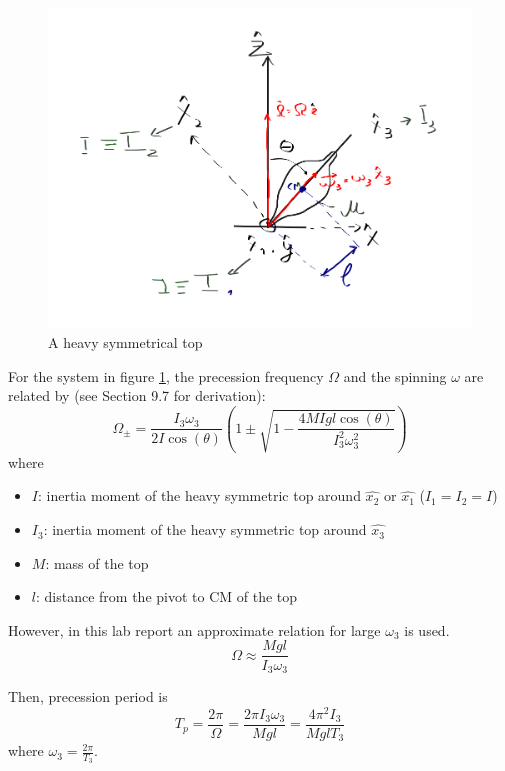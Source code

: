 \begin{multicols}{2}
\begin{figure}[H]
  \centering
  \includegraphics[width=\columnwidth]{gyroscope/images/top}
  \caption{A heavy symmetrical top}
  \label{fig:theory:top}
\end{figure}

For the system in figure \ref{fig:theory:top}, the precession frequency $\Omega$ and the spinning $\omega$ are related by (see Section 9.7 \cite{morin} for derivation):
\begin{equation*}
  \Omega_{\pm} = \frac{I_{3}\omega_3}{2I\cos(\theta)} \left( 1 \pm \sqrt{1 - \frac{4MIgl\cos(\theta)}{I_{3}^{2} \omega_{3}^{2}}}  \right)
\end{equation*}
where
\begin{itemize}
\item $I$: inertia moment of the heavy symmetric top around $\hat{x_{2}}$ or $\hat{x_{1}}$ ($I_{1} = I_{2} = I$)
\item $I_{3}$: inertia moment of the heavy symmetric top around $\hat{x_{3}}$
\item $M$: mass of the top
\item $l$: distance from the pivot to CM of the top
\end{itemize}

However, in this lab report an approximate relation for large $\omega_{3}$ is used.
\begin{equation}
  \label{eq:theory:precession_frequency}
  \Omega \approx \frac{Mgl}{I_{3}\omega_{3}}
\end{equation}

Then, precession period is
\begin{equation}
  \label{eq:theory:precession_period}
  T_{p} = \frac{2\pi}{\Omega} = \frac{2\pi I_{3} \omega_3}{Mgl} = \frac{4\pi^{2} I_{3}}{MglT_{3}}
\end{equation}
where $\omega_{3} = \frac{2\pi}{T_{3}}$.


\end{multicols}
